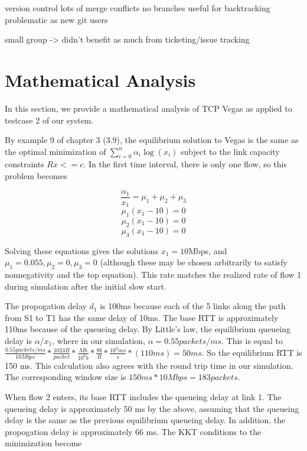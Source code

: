 \documentclass{article}
\begin{document}
version control
lots of merge conflicts
no branches
useful for backtracking
problematic as new git users

small group -> didn’t benefit as much from ticketing/issue tracking





\section{Mathematical Analysis}
In this section, we provide a mathematical analysis of TCP Vegas as applied to testcase 2 of our system. 

By example 9 of chapter 3 (3.9), the equilibrium solution to Vegas is the same as the optimal minimization of $\displaystyle\sum\limits_{i=0}^n \alpha_i \log(x_i)$ subject to the link capacity constraints $Rx <= c$. In the first time interval, there is only one flow, so this problem becomes

$$\frac{\alpha_1}{x_1}=\mu_1 + \mu_2 + \mu_3$$
$$\mu_1 (x_1 - 10) = 0$$
$$\mu_2 (x_1 - 10) = 0$$
$$\mu_3 (x_1 - 10) = 0$$

Solving these equations gives the solutions $x_1=10$Mbps, and $\mu_1 = 0.055, \mu_2 = 0, \mu_3 = 0$ (although these may be chosen arbitrarily to satisfy nonnegativity and the top equation). This rate matches the realized rate of flow 1 during simulation after the initial slow start.

The propogation delay $d_1$ is 100ms because each of the 5 links along the path from S1 to T1 has the same delay of 10ms. The base RTT is approximately 110ms because of the queueing delay. By Little's law, the equilibrium queueing delay is $\alpha /  x_1$, where in our simulation, $\alpha = 0.55 packets/ms$. This is equal to $\frac{0.55 packets/ms}{10 Mbps} * \frac{1024 B}{packet} * \frac{Mb}{10^6 b} * \frac{8 b}{B} * \frac{10^3 ms}{s} * (110 ms) = 50 ms$. So the equilibrium RTT is 150 ms. This calculation also agrees with the round trip time in our simulation. The corresponding window size is $150ms * 10Mbps = 183 packets$.

When flow 2 enters, its base RTT includes the queueing delay at link 1. The queueing delay is approximately 50 ms by the above, assuming that the queueing delay is the same as the previous equilibrium queueing delay. In addition, the propogation delay is approximately 66 ms. The KKT conditions to the minimization become
\end{document}
